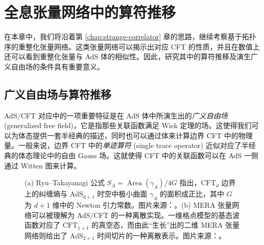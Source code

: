 \chapter{全息张量网络中的算符推移}
\label{chap:operator-pushing}

在本章中，我们将沿着第 \ref{chap:strange-correlator} 章的思路，继续考察基于拓扑序的重整化张量网络。这类张量网络可以揭示出对应 CFT 的性质，并且在数值上还可以看到重整化张量与 AdS 体的相似性。因此，研究其中的算符推移及演生广义自由场的条件具有重要意义。

\section{广义自由场与算符推移}

AdS/CFT 对应\cite{maldacena1999large}中的一项重要特征是在 AdS 体中所演生出的\emph{广义自由场} (generalized free field)，它是指那些关联函数满足 Wick 定理的场\cite{greenberg1961generalized,dutsch2003generalized,liu2019dimensional,collier2019quantum,nebabu2023bulk}。这使得我们可以为体态提供一套半经典的描述，同时也可以通过体来计算边界 CFT 中的物理量。一般来说，边界 CFT 中的\emph{单迹算符} (single trace operator) 近似对应了半经典的体态理论中的自由 Gauss 场。这就使得 CFT 中的关联函数可以在 AdS 一侧通过 Witten 图来计算\cite{witten1998anti,gubser1998gauge}。

\begin{figure}[htb]
  \centering
   \qquad
  \caption[全息张量网络与 AdS/CFT 对应]{(a) Ryu--Takayanagi 公式 $S_A=\operatorname{Area}(\gamma_A)/4G$ 指出，$\text{CFT}_d$ 边界上的纠缠熵与 $\text{AdS}_{d+1}$ 时空中极小曲面 $\gamma_A$ 的面积成正比，其中 $G$ 为 $d+1$ 维中的 Newton 引力常数。图片来源：\parencite{nishioka2009holographic}。(b) MERA 张量网络可以被理解为 AdS/CFT 的一种离散实现。一维格点模型的基态波函数对应了 $\text{CFT}_{1+1}$ 的真空态，而由此“生长”出的二维 MERA 张量网络则给出了 $\text{AdS}_{2+1}$ 时间切片的一种离散表示。图片来源：\parencite{evenbly2011tensor}。}
\end{figure}

